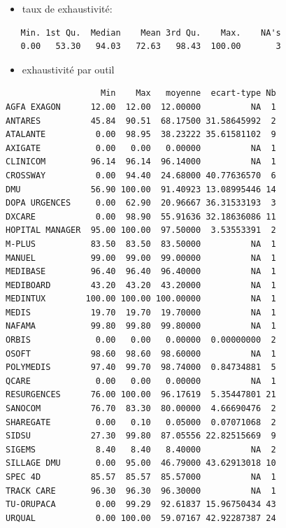 \documentclass[]{article}
\providecommand{\tightlist}{%
  \setlength{\itemsep}{0pt}\setlength{\parskip}{0pt}}
\begin{document}
\begin{itemize}
\tightlist
\item
  taux de exhaustivité:
\end{itemize}

\begin{verbatim}
   Min. 1st Qu.  Median    Mean 3rd Qu.    Max.    NA's 
   0.00   53.30   94.03   72.63   98.43  100.00       3 
\end{verbatim}

\begin{itemize}
\tightlist
\item
  exhaustivité par outil
\end{itemize}

\begin{verbatim}
                   Min    Max   moyenne  ecart-type Nb
AGFA EXAGON      12.00  12.00  12.00000          NA  1
ANTARES          45.84  90.51  68.17500 31.58645992  2
ATALANTE          0.00  98.95  38.23222 35.61581102  9
AXIGATE           0.00   0.00   0.00000          NA  1
CLINICOM         96.14  96.14  96.14000          NA  1
CROSSWAY          0.00  94.40  24.68000 40.77636570  6
DMU              56.90 100.00  91.40923 13.08995446 14
DOPA URGENCES     0.00  62.90  20.96667 36.31533193  3
DXCARE            0.00  98.90  55.91636 32.18636086 11
HOPITAL MANAGER  95.00 100.00  97.50000  3.53553391  2
M-PLUS           83.50  83.50  83.50000          NA  1
MANUEL           99.00  99.00  99.00000          NA  1
MEDIBASE         96.40  96.40  96.40000          NA  1
MEDIBOARD        43.20  43.20  43.20000          NA  1
MEDINTUX        100.00 100.00 100.00000          NA  1
MEDIS            19.70  19.70  19.70000          NA  1
NAFAMA           99.80  99.80  99.80000          NA  1
ORBIS             0.00   0.00   0.00000  0.00000000  2
OSOFT            98.60  98.60  98.60000          NA  1
POLYMEDIS        97.40  99.70  98.74000  0.84734881  5
QCARE             0.00   0.00   0.00000          NA  1
RESURGENCES      76.00 100.00  96.17619  5.35447801 21
SANOCOM          76.70  83.30  80.00000  4.66690476  2
SHAREGATE         0.00   0.10   0.05000  0.07071068  2
SIDSU            27.30  99.80  87.05556 22.82515669  9
SIGEMS            8.40   8.40   8.40000          NA  2
SILLAGE DMU       0.00  95.00  46.79000 43.62913018 10
SPEC 4D          85.57  85.57  85.57000          NA  1
TRACK CARE       96.30  96.30  96.30000          NA  1
TU-ORUPACA        0.00  99.29  92.61837 15.96750434 43
URQUAL            0.00 100.00  59.07167 42.92287387 24
\end{verbatim}
\end{document}

